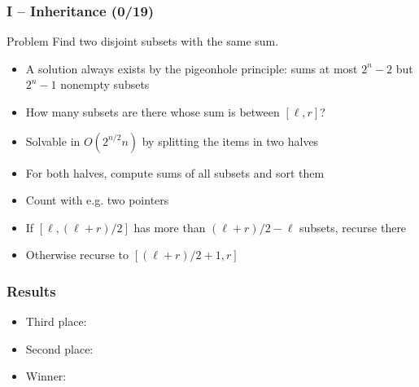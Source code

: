 \documentclass{beamer}
\begin{document}
\begin{frame}
\frametitle{I -- Inheritance (0/19)}
    \begin{block}{Problem}
        Find two disjoint subsets with the same sum.
    \end{block}
    \begin{itemize}
        \item A solution always exists by the pigeonhole principle: sums at most $2^{n} - 2$ but $2^{n} - 1$ nonempty subsets
        \item How many subsets are there whose sum is between $[\ell, r]$?
        \item Solvable in $O(2^{n/2} n)$ by splitting the items in two halves
        \item For both halves, compute sums of all subsets and sort them
        \item Count with e.g. two pointers
        \item If $[\ell, (\ell + r) / 2]$ has more than $(\ell + r) / 2 - \ell$ subsets, recurse there
        \item Otherwise recurse to $[(\ell + r) / 2 + 1, r]$
    \end{itemize}
\end{frame}

\begin{frame}
    \frametitle{Results}
    \begin{itemize}
        \item<2-> Third place:  
        \item<4-> Second place: 
        \item<6-> Winner: 
    \end{itemize}
\end{frame}
\end{document}
